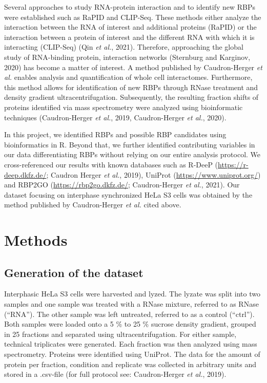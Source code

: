 \documentclass[
]{article}
\begin{document}
Several approaches to study RNA-protein interaction and to identify new
RBPs were established such as RaPID and CLIP-Seq. These methods either
analyze the interaction between the RNA of interest and additional
proteins (RaPID) or the interaction between a protein of interest and
the different RNA with which it is interacting (CLIP-Seq) (Qin \emph{et
al.}, 2021). Therefore, approaching the global study of RNA-binding
protein, interaction networks (Sternburg and Karginov, 2020) has become
a matter of interest. A method published by Caudron-Herger \emph{et al.}
enables analysis and quantification of whole cell interactomes.
Furthermore, this method allows for identification of new RBPs through
RNase treatment and density gradient ultracentrifugation. Subsequently,
the resulting fraction shifts of proteins identified via mass
spectrometry were analyzed using bioinformatic techniques
(Caudron-Herger \emph{et al.}, 2019, Caudron-Herger \emph{et al.},
2020).

In this project, we identified RBPs and possible RBP candidates using
bioinformatics in R. Beyond that, we further identified contributing
variables in our data differentiating RBPs without relying on our entire
analysis protocol. We cross-referenced our results with known databases
such as R-DeeP (\url{https://r-deep.dkfz.de/}; Caudron Herger \emph{et
al.}, 2019), UniProt (\url{https://www.uniprot.org/}) and RBP2GO
(\url{https://rbp2go.dkfz.de/}; Caudron-Herger \emph{et al.}, 2021). Our
dataset focusing on interphase synchronized HeLa S3 cells was obtained
by the method published by Caudron-Herger \emph{et al.} cited above.

\newpage

\hypertarget{methods}{%
\section{Methods}\label{methods}}

\hypertarget{generation-of-the-dataset}{%
\subsection{Generation of the dataset}\label{generation-of-the-dataset}}

Interphasic HeLa S3 cells were harvested and lyzed. The lyzate was split
into two samples and one sample was treated with a RNase mixture,
referred to as RNase (``RNA''). The other sample was left untreated,
referred to as a control (``ctrl''). Both samples were loaded onto a 5
\% to 25 \% sucrose density gradient, grouped in 25 fractions and
separated using ultracentrifugation. For either sample, technical
triplicates were generated. Each fraction was then analyzed using mass
spectrometry. Proteins were identified using UniProt. The data for the
amount of protein per fraction, condition and replicate was collected in
arbitrary units and stored in a .csv-file (for full protocol see:
Caudron-Herger \emph{et al.}, 2019).
\end{document}
